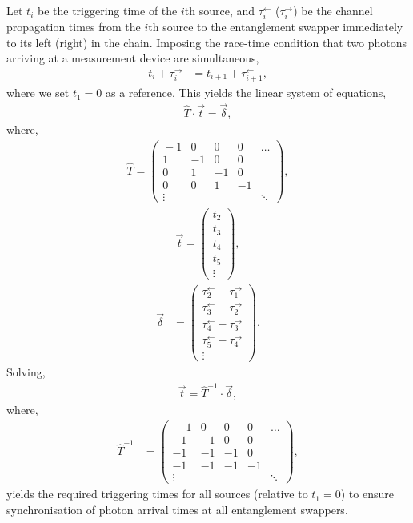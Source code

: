 Let $t_i$ be the triggering time of the $i$th source, and $\tau_i^\leftarrow$ ($\tau_i^\rightarrow$) be the channel propagation times from the $i$th source to the entanglement swapper immediately to its left (right) in the chain. Imposing the race-time condition that two photons arriving at a measurement device are simultaneous,
\begin{align}\label{eq:ent_sync_cond}
t_i + \tau_i^\rightarrow &= t_{i+1} + \tau_{i+1}^\leftarrow,	
\end{align}
where we set \mbox{$t_1=0$} as a reference. This yields the linear system of equations,
\begin{align}
\hat{T}\cdot\vec{t} = \vec{\delta},
\end{align}
where,
\begin{align}
\hat{T} = \left(\begin{matrix}{}
 -1 & 0 & 0 & 0 &\dots \\
 1 & -1 & 0 & 0 & \\
 0 & 1 & -1 & 0 & \\
 0 & 0 & 1 & -1 & \\
 \vdots & & & & \ddots
\end{matrix}\right),
\end{align}
\begin{align}
\vec{t} = \left(\begin{matrix}{}
t_2\\
t_3\\
t_4\\
t_5\\
\vdots	
\end{matrix}\right),
\end{align}
\begin{align}
\vec\delta &= \left(\begin{matrix}{}
\tau_{2}^\leftarrow - \tau_1^\rightarrow	 \\
\tau_{3}^\leftarrow - \tau_2^\rightarrow	 \\
\tau_{4}^\leftarrow - \tau_3^\rightarrow	 \\
\tau_{5}^\leftarrow - \tau_4^\rightarrow	 \\
\vdots
\end{matrix}\right).
\end{align}
Solving,
\begin{align}\label{eq:repeater_trig_time_sol}
	\vec{t} = \hat{T}^{-1}\cdot\vec\delta,
\end{align}
where,
\begin{align}
	\hat{T}^{-1} & = \left(\begin{matrix}{}
 -1 & 0 & 0 & 0 &\dots \\
 -1 & -1 & 0 & 0 & \\
 -1 & -1 & -1 & 0 & \\
 -1 & -1 & -1 & -1 & \\
 \vdots & & & & \ddots
\end{matrix}\right),
\end{align}
yields the required triggering times for all sources (relative to \mbox{$t_1=0$}) to ensure synchronisation of photon arrival times at all entanglement swappers.